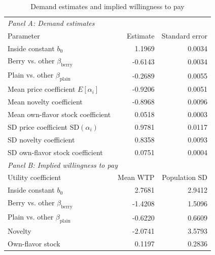 \begin{table}[htbp]
\centering
\small
\caption{Demand estimates and implied willingness to pay}
\label{tab:estimates-and-wtp}
\begin{tabular}{lrr}
\toprule
\multicolumn{3}{l}{\textit{Panel A: Demand estimates}} \\
Parameter & Estimate & Standard error \\
\midrule
Inside constant $b_0$ & 1.1969 & 0.0034 \\
Berry vs. other $\beta_{\mathrm{berry}}$ & -0.6143 & 0.0034 \\
Plain vs. other $\beta_{\mathrm{plain}}$ & -0.2689 & 0.0055 \\
Mean price coefficient $E[\alpha_i]$ & -0.9206 & 0.0051 \\
Mean novelty coefficient & -0.8968 & 0.0096 \\
Mean own-flavor stock coefficient & 0.0518 & 0.0003 \\
SD price coefficient $\mathrm{SD}(\alpha_i)$ & 0.9781 & 0.0117 \\
SD novelty coefficient & 0.8358 & 0.0093 \\
SD own-flavor stock coefficient & 0.0751 & 0.0004 \\
\midrule
\multicolumn{3}{l}{\textit{Panel B: Implied willingness to pay}} \\
Utility coefficient & Mean WTP & Population SD \\
\midrule
Inside constant $b_0$ & 2.7681 & 2.9412 \\
Berry vs. other $\beta_{\mathrm{berry}}$ & -1.4208 & 1.5096 \\
Plain vs. other $\beta_{\mathrm{plain}}$ & -0.6220 & 0.6609 \\
Novelty & -2.0741 & 3.5793 \\
Own-flavor stock & 0.1197 & 0.2836 \\
\bottomrule
\end{tabular}
\end{table}
